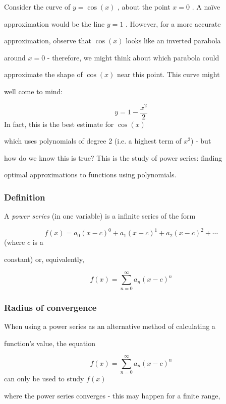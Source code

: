 Consider the curve of $y=\cos(x)$ , about the point $x=0$ . A naïve

approximation would be the line $y=1$ . However, for a more accurate

approximation, observe that $\cos(x)$ looks like an inverted parabola

around $x=0$ - therefore, we might think about which parabola could

approximate the shape of $\cos(x)$ near this point. This curve might

well come to mind:


\[
y=1-\frac{x^2}{2}
\] In fact, this is the best estimate for $\cos(x)$

which uses polynomials of degree 2 (i.e. a highest term of $x^2$) - but

how do we know this is true? This is the study of power series: finding

optimal approximations to functions using polynomials.


\subsubsection{Definition}
\label{sss:defi-3061}


A \textit{power series} (in one variable) is a infinite series of the form


\[
f(x)=a_0(x-c)^0+a_1(x-c)^1+a_2(x-c)^2+\cdots
\] (where $c$ is a

constant) or, equivalently,


\[
f(x)=\sum _{n=0}^\infty a_n(x-c)^n
\]


\subsubsection{Radius of convergence}
\label{sss:radi-7672}


When using a power series as an alternative method of calculating a

function's value, the equation


\[
f(x)=\sum _{n=0}^\infty a_n(x-c)^n
\] can only be used to study $f(x)$

where the power series converges - this may happen for a finite range,

